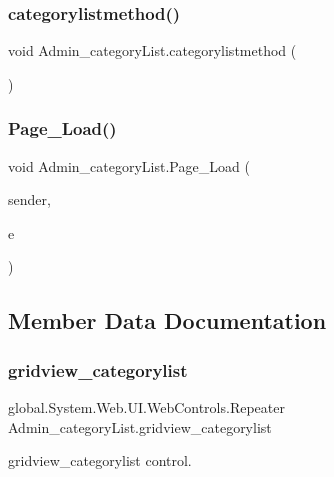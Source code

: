 \subsubsection{\texorpdfstring{categorylistmethod()}{categorylistmethod()}}
{\footnotesize\ttfamily void Admin\+\_\+category\+List.\+categorylistmethod (\begin{DoxyParamCaption}{ }\end{DoxyParamCaption})}

\mbox{\label{class_admin__category_list_a343f83f56c64f0c94863b13fe1e2eaa7}} 
\subsubsection{\texorpdfstring{Page\_Load()}{Page\_Load()}}
{\footnotesize\ttfamily void Admin\+\_\+category\+List.\+Page\+\_\+\+Load (\begin{DoxyParamCaption}\item[{object}]{sender,  }\item[{Event\+Args}]{e }\end{DoxyParamCaption})\hspace{0.3cm}{\ttfamily [protected]}}



\subsection{Member Data Documentation}
\mbox{\label{class_admin__category_list_af0fc1f8772137313d07684077c042703}} 
\subsubsection{\texorpdfstring{gridview\_categorylist}{gridview\_categorylist}}
{\footnotesize\ttfamily global.\+System.\+Web.\+U\+I.\+Web\+Controls.\+Repeater Admin\+\_\+category\+List.\+gridview\+\_\+categorylist\hspace{0.3cm}{\ttfamily [protected]}}



gridview\+\_\+categorylist control. 

